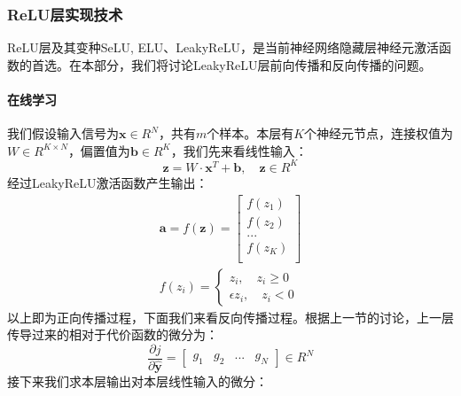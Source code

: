 \documentclass[UTF8]{article}
\begin{document}
\subsubsection{ReLU层实现技术}
ReLU层及其变种SeLU, ELU、LeakyReLU，是当前神经网络隐藏层神经元激活函数的首选。在本部分，我们将讨论LeakyReLU层前向传播和反向传播的问题。\newline
\paragraph{在线学习}
我们假设输入信号为$\boldsymbol{x} \in R^{N}$，共有$m$个样本。本层有$K$个神经元节点，连接权值为$W \in R^{K \times N}$，偏置值为$\boldsymbol{b} \in R^{K}$，我们先来看线性输入：
\begin{equation}
\boldsymbol{z}=W \cdot \boldsymbol{x}^{T} + \boldsymbol{b}, \quad \boldsymbol{z} \in R^{K}
\label{mlp-relu-z-def}
\end{equation}
经过LeakyReLU激活函数产生输出：
\begin{equation}
\begin{aligned}
\boldsymbol{a}=f(\boldsymbol{z})=\begin{bmatrix}
f(z_{1}) \\
f(z_{2}) \\
... \\
f(z_{K}) \\
\end{bmatrix} \\
f(z_{i})=\begin{cases}
z_{i}, \quad z_{i} \ge 0 \\
\epsilon z_{i}, \quad z_{i} < 0
\end{cases}
\end{aligned}
\label{mlp-leaky-relu-z-yhat-def}
\end{equation}
以上即为正向传播过程，下面我们来看反向传播过程。根据上一节的讨论，上一层传导过来的相对于代价函数的微分为：
\begin{equation}
\frac{\partial{j}}{\partial{\hat{\boldsymbol{y}}}}=\begin{bmatrix}
g_{1} & g_{2} & ... & g_{N}
\end{bmatrix} \in R^{N}
\label{mlp-leaky-relu-pj-py}
\end{equation}
接下来我们求本层输出对本层线性输入的微分：
\end{document}
